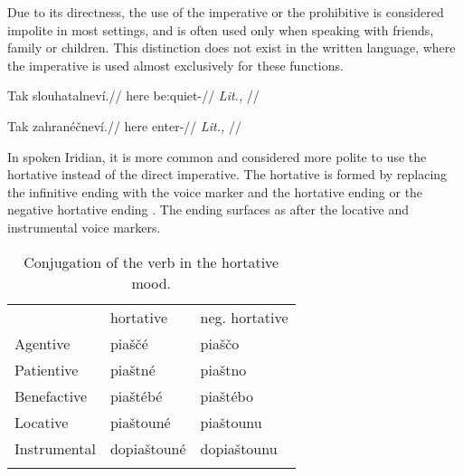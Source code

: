 Due to its directness, the use of the imperative or the prohibitive is
considered impolite in most settings, and is often used only when speaking with
friends, family or children. This distinction does not exist in the written
language, where the imperative is used almost exclusively for these functions.

\pex
\begingl
    \gla Tak slouhatalneví.//
    \glb here be:quiet-//
    \glft {} \textit{Lit.,} //
\endgl
\xe

\pex
\begingl
    \gla Tak zahranéčneví.//
    \glb here enter-//
    \glft {} \textit{Lit.,} //
\endgl
\xe

In spoken Iridian, it is more common and considered more polite to use the
hortative instead of the direct imperative. The hortative is formed by replacing
the infinitive ending  with the voice marker and the hortative ending
 or the negative hortative ending . The ending  surfaces
as  after the locative and instrumental voice markers.

\begin{table}
    \footnotesize\sffamily
		\caption{Conjugation of the verb  in the hortative mood.}
		\label{tbl:hortative}
		\medskip
    \begin{tabu}to 0.7
         \toprule \addlinespace
         &{\sc hortative}&{\sc neg. hortative}  \\ \addlinespace
         \midrule \addlinespace
         Agentive &
         {piaščé} & 
         {piaščo}\\ \addlinespace

         Patientive &
         {piaštné}&
         {piaštno}\\ \addlinespace

         Benefactive &
         {piaštébé} &
		 {piaštébo}\\ \addlinespace

         Locative &
         {piaštouné} &
		 {piaštounu}\\ \addlinespace

         Instrumental &
         {dopiaštouné} &
		 {dopiaštounu}\\ \addlinespace

         \bottomrule
    \end{tabu}

\end{table}

